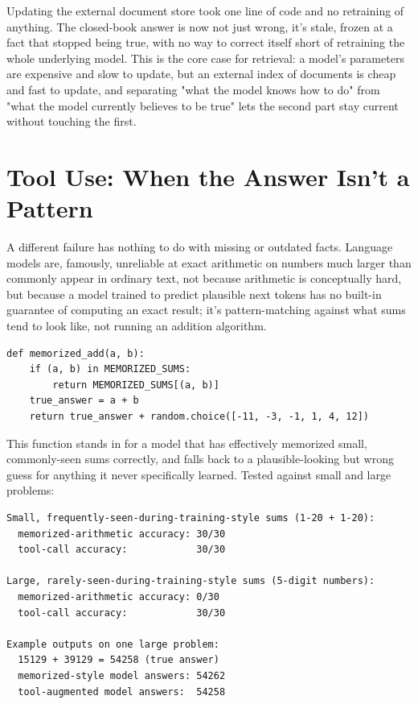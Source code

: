 Updating the external document store took one line of code and no retraining of anything. The closed-book answer is now not just wrong, it's stale, frozen at a fact that stopped being true, with no way to correct itself short of retraining the whole underlying model. This is the core case for retrieval: a model's parameters are expensive and slow to update, but an external index of documents is cheap and fast to update, and separating "what the model knows how to do" from "what the model currently believes to be true" lets the second part stay current without touching the first.

\section*{Tool Use: When the Answer Isn't a Pattern}

A different failure has nothing to do with missing or outdated facts. Language models are, famously, unreliable at exact arithmetic on numbers much larger than commonly appear in ordinary text, not because arithmetic is conceptually hard, but because a model trained to predict plausible next tokens has no built-in guarantee of computing an exact result; it's pattern-matching against what sums tend to look like, not running an addition algorithm.

\begin{Verbatim}[fontsize=\small, frame=single, xleftmargin=1em, xrightmargin=1em]
def memorized_add(a, b):
    if (a, b) in MEMORIZED_SUMS:
        return MEMORIZED_SUMS[(a, b)]
    true_answer = a + b
    return true_answer + random.choice([-11, -3, -1, 1, 4, 12])
\end{Verbatim}

This function stands in for a model that has effectively memorized small, commonly-seen sums correctly, and falls back to a plausible-looking but wrong guess for anything it never specifically learned. Tested against small and large problems:

\begin{Verbatim}[fontsize=\small, frame=single, xleftmargin=1em, xrightmargin=1em]
Small, frequently-seen-during-training-style sums (1-20 + 1-20):
  memorized-arithmetic accuracy: 30/30
  tool-call accuracy:            30/30

Large, rarely-seen-during-training-style sums (5-digit numbers):
  memorized-arithmetic accuracy: 0/30
  tool-call accuracy:            30/30

Example outputs on one large problem:
  15129 + 39129 = 54258 (true answer)
  memorized-style model answers: 54262
  tool-augmented model answers:  54258
\end{Verbatim}

